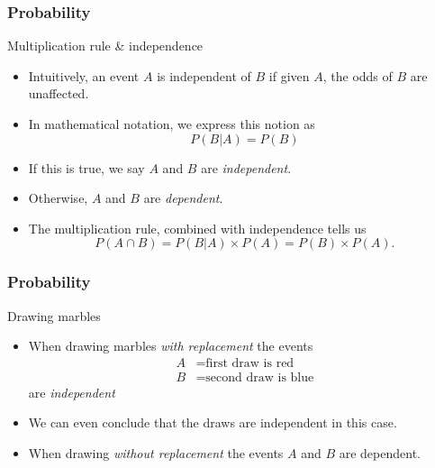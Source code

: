 \documentclass[handout]{beamer}
\begin{document}

   \begin{frame} \frametitle{Probability}

   \begin{block}
   {Multiplication rule \& independence}
   \begin{itemize}
   \item Intuitively, an event $A$ is independent of $B$ if given $A$,
   the odds of $B$ are unaffected.
   \item In mathematical notation, we express this
   notion as
   $$
   P(B|A)=P(B)
   $$
   \item If this is true, we say $A$ and $B$ are {\em independent}.
     \item Otherwise, $A$ and $B$ are {\em dependent}.
   \item The multiplication rule, combined with independence tells us
   $$
   P(A \cap B) = P(B|A) \times P(A) = P(B) \times P(A).
   $$
   \end{itemize}
   \end{block}
   \end{frame}


   \begin{frame} \frametitle{Probability}

   \begin{block}
   {Drawing marbles}
   \begin{itemize}
   \item When drawing marbles {\em with replacement}
   the events
   $$
   \begin{aligned}
   A &= \text{first draw is red} \\
   B &= \text{second draw is blue}
   \end{aligned}
   $$
   are {\em independent}
   \item We can even conclude that the draws are independent in this case.
   \item When drawing {\em without replacement}
   the events $A$ and $B$ are dependent.
   \end{itemize}
   \end{block}
   \end{frame}

\end{document}

